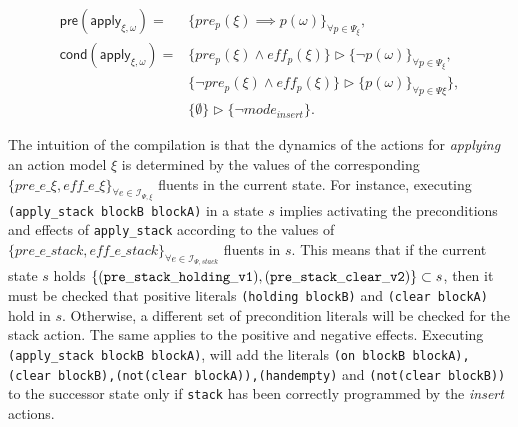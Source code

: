 \documentclass{article}
\newcommand{\pre}{\mathsf{pre}}     %
\newcommand{\cond}{\mathsf{cond}}   %
\begin{document}
\begin{small}
\begin{align*}
\pre(\mathsf{apply_{\xi,\omega}})=&\{pre_{p}(\xi)\implies p(\omega)\}_{\forall p\in\Psi_\xi},\\
\cond(\mathsf{apply_{\xi,\omega}})=&\{pre_{p}(\xi)\wedge eff_{p}(\xi)\}\rhd\{\neg p(\omega)\}_{\forall p\in\Psi_\xi},\\
&\{\neg pre_{p}(\xi)\wedge eff_{p}(\xi)\}\rhd\{p(\omega)\}_{\forall p\in\Psi\xi}\},\\
&\{\emptyset\}\rhd\{\neg mode_{insert}\}.
\end{align*}
\end{small}

The intuition of the compilation is that the dynamics of the actions for {\em applying} an action model $\xi$ is determined by the values of the corresponding $\{pre\_e\_\xi, eff\_e\_\xi\}_{\forall e\in{\mathcal I}_{\Psi,\xi}}$ fluents in the current state. For instance, executing {\tt{\small (apply\_stack blockB blockA)}} in a state $s$ implies activating the preconditions and effects of {\tt{\small apply\_stack}} according to the values of $\{pre\_e\_stack, eff\_e\_stack\}_{\forall e\in{\mathcal I}_{\Psi,stack}}$ fluents in $s$. This means that if the current state $s$ holds $\{{\tt\scriptsize (pre\_stack\_holding\_v1),(pre\_stack\_clear\_v2)}\} \subset s$, then it must be checked that positive literals {\tt{\small (holding blockB)}} and {\tt{\small (clear blockA)}} hold in $s$. Otherwise, a different set of precondition literals will be checked for the stack action. The same applies to the positive and negative effects. Executing {\tt{\small (apply\_stack blockB blockA)}}, will add the literals {\tt{\small (on blockB blockA),(clear blockB),(not(clear blockA)),(handempty)}} and {\tt{\small(not(clear blockB))}} to the successor state only if {\tt{\small stack}} has been correctly programmed by the {\em insert} actions.
\end{document}

